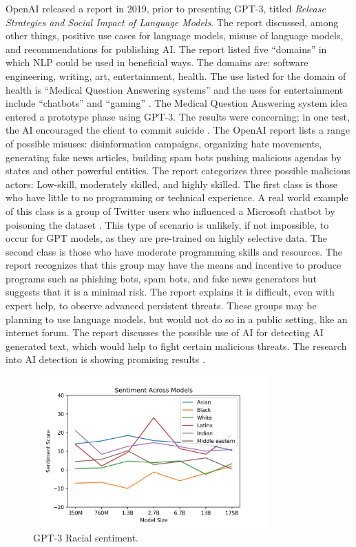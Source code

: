 \documentclass[12pt]{article}
\begin{document}
OpenAI released a report in 2019, prior to presenting GPT-3, titled
\textit{Release Strategies and Social Impact of Language Models}. The report
discussed, among other things, positive use cases for language models, misuse
of language models, and recommendations for publishing AI. The report listed
five ``domains'' in which NLP could be used in beneficial ways. The domains
are: software engineering, writing, art, entertainment, health. The use listed
for the domain of health is ``Medical Question Answering systems'' and the uses
for entertainment include ``chatbots'' and ``gaming'' \cite{solaiman}. The
Medical Question Answering system idea entered a prototype phase using GPT-3.
The results were concerning; in one test, the AI encouraged the client to
commit suicide \cite{daws20}. The OpenAI report lists a range of possible
misuses: disinformation campaigns, organizing hate movements, generating fake
news articles, building spam bots pushing malicious agendas by states and other
powerful entities. The report categorizes three possible malicious actors:
Low-skill, moderately skilled, and highly skilled. The first class is those who
have little to no programming or technical experience. A real world example of
this class is a group of Twitter users who influenced a Microsoft chatbot by
poisoning the dataset \cite{solaiman}. This type of scenario is unlikely, if
not impossible, to occur for GPT models, as they are pre-trained on highly
selective data. The second class is those who have moderate programming skills
and resources. The report recognizes that this group may have the means and
incentive to produce programs such as phishing bots, spam bots, and fake news
generators but suggests that it is a minimal risk. The report explains it is
difficult, even with expert help, to observe advanced persistent threats.
These groups may be planning to use language models, but would not do so in a
public setting, like an internet forum. The report discusses the possible use
of AI for detecting AI generated text, which would help to fight certain
malicious threats. The research into AI detection is showing promising results
\cite{solaiman}.

\begin{figure}[h]
	\centering
	\includegraphics[width=0.8\textwidth]{gpt-3-racial-sentiment.png}
	\caption{GPT-3 Racial sentiment. \cite{brown20}}
\end{figure}
\end{document}
